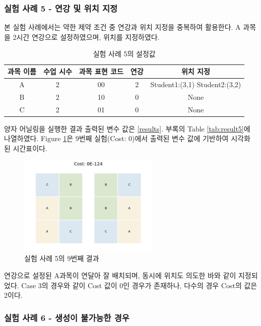 \documentclass{article}
\begin{document}
    \subsubsection{실험 사례 5 - 연강 및 위치 지정}

본 실험 사례에서는 약한 제약 조건 중 연강과 위치 지정을 중복하여 활용한다. A 과목을 2시간 연강으로 설정하였으며, 위치를 지정하였다.

    \begin{table}[htb!]
        \centering
        \begin{tabular}{c c c c c}
             \hline
             과목 이름 & 수업 시수 & 과목 표현 코드 & 연강 & 위치 지정\\
             \hline
             A & 2 & 00 & 2 & Student1:(3,1) Student2:(3,2)\\
             B & 2 & 10 & 0 & None\\
             C & 2 & 01 & 0 & None\\
             \hline
        \end{tabular}
        \caption{실험 사례 5의 설정값}\label{tab:testcase5}
    \end{table}

양자 어닐링을 실행한 결과 출력된 변수 값은 \ref{results}. 부록의 Table \ref{tab:result5}에 나열하였다. Figure \ref{fig:case5}은 9번째 실험(Cost: 0)에서 출력된 변수 값에 기반하여 시각화 된 시간표이다.

    \begin{figure}[htb!]
        \centering
        \includegraphics[width=0.6\textwidth]{images/Case5.png}
        \caption{실험 사례 5의 9번째 결과}
        \label{fig:case5}
    \end{figure}

연강으로 설정된 A과목이 연달아 잘 배치되며, 동시에 위치도 의도한 바와 같이 지정되었다. Case 3의 경우와 같이 Cost 값이 0인 경우가 존재하나, 다수의 경우 Cost의 값은 2이다. 

    \subsubsection{실험 사례 6 - 생성이 불가능한 경우}
\end{document}
